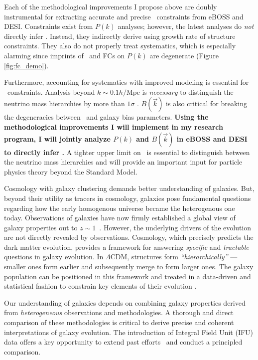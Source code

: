 Each of the methodological improvements I propose above are doubly instrumental for extracting accurate and precise \mneut ~constraints from eBOSS and DESI.
Constraints exist from $P(k)$ analyses; however, the latest analyses do {\em not} directly infer \mneut \citep{beut_neut, gm_neut2015}. 
Instead, they indirectly derive \mneut using growth rate of structure constraints.
They also do not properly treat systematics, which is especially alarming since imprints of \mneut ~and FCs on $P(k)$ are degenerate (Figure \ref{fig:fc_demo}). 

Furthermore, accounting for systematics with improved modeling is essential for \mneut ~constraints. 
Analysis beyond $k \sim 0.1h/\mathrm{Mpc}$ is {\em necessary} to distinguish the neutrino mass hierarchies by more than $1 \sigma$ \citep[][DESI \emph{FDR}]{font_neut}. 
$B(\vec{k})$ is also critical for breaking the degeneracies between \mneut~and galaxy bias parameters. 
{\bf Using the methodological improvements I will implement in my research program, I will jointly analyze $P(k)$ and $B(\vec{k})$ in eBOSS and DESI to directly infer \mneut.}
A tighter upper limit on \mneut ~is essential to distinguish between the neutrino mass hierarchies and will provide an important input for particle physics theory beyond the Standard Model.

Cosmology with galaxy clustering demands better understanding of galaxies. 
But, beyond their utility as tracers in cosmology, galaxies pose fundamental questions regarding how the early homogenous universe became the heterogenous one today. 
Observations of galaxies have now firmly established a global view of galaxy properties out to $z{\sim}1$~\citep[\emph{e.g.}][]{qfenv}. 
However, the underlying drivers of the evolution are not directly revealed by observations. %
Cosmology, which precisely predicts the dark matter evolution, provides a framework for answering {\em specific} and {\em tractable} questions in galaxy evolution.
In $\Lambda$CDM, structures form \emph{``hierarchically''} --- smaller ones form earlier and subsequently merge to form larger ones.
The galaxy population can be positioned in this framework and treated in a data-driven and statistical fashion to constrain key elements of their evolution \citep[\emph{e.g.}][]{wetzel2013}. 

Our understanding of galaxies depends on combining galaxy properties derived from {\em heterogeneous} observations and methodologies.
A thorough and direct comparison of these methodologies is critical to derive precise and coherent interpretations of galaxy evolution. 
The introduction of Integral Field Unit (IFU) data offers a key opportunity to extend past efforts~\citep[\emph{e.g.}][]{salim} and conduct a principled comparison. 


